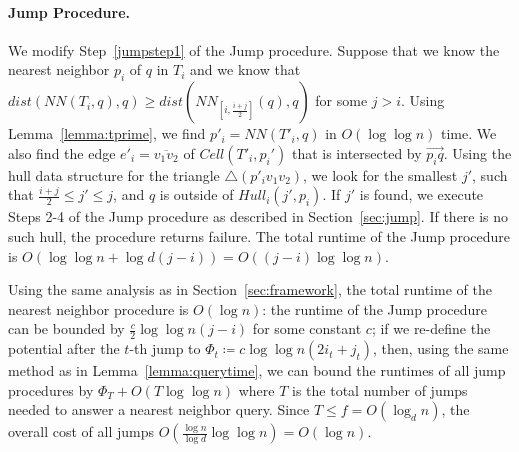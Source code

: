 \documentclass[10pt,a4paper]{amsart}
\newcommand{\ov}[1]{\overline{#1}}
\newcommand{\ovar}[1]{\overrightarrow{#1}}
\newcommand{\Cell}{\mathit{Cell}}
\newcommand{\Hull}{\mathit{Hull}}
\newcommand{\NN}{\mathit{NN}}
\begin{document}
\paragraph*{Jump Procedure.}
We modify Step~\ref{jumpstep1} of the Jump procedure. Suppose that we know the nearest neighbor $p_i$ of $q$ in $T_i$ and we know that %
$dist(\NN(T_i,q),q) \ge dist(\NN_{[i,\frac{i+j}{2}]}(q),q)$ for some $j>i$.
Using Lemma~\ref{lemma:tprime}, we find $p'_i=\NN(T'_i,q)$ in $O(\log\log n)$ time. We also find the edge $e'_i=\ov{v_1v_2}$ of $\Cell(T'_i, p_i')$ that  is intersected by $\ovar{p_iq}$.  Using the hull data structure for the triangle $\triangle(p'_iv_1v_2)$, we look for the smallest $j'$, such that $\frac{i+j}{2}\le j'\le j$,  and $q$ is outside of $\Hull_i(j',p_i)$. If $j'$ is found, we execute Steps 2-4 of the Jump procedure as described in Section~\ref{sec:jump}. If there is no such hull, the procedure returns failure.  The total runtime of the Jump procedure is $O(\log\log n + \log d(j-i))=O((j-i)\log \log n)$.

Using the same analysis as in Section~\ref{sec:framework}, the total runtime of the nearest neighbor procedure is $O(\log n)$: the runtime of the Jump procedure can be bounded by  $\frac{c}{2}\log\log n (j-i)$ for some constant $c$; if we re-define the potential after the $t$-th jump to $\Phi_t\coloneqq c\log\log n(2i_t+j_t)$, then, using the same method as in Lemma~\ref{lemma:querytime}, we can bound the runtimes of all jump procedures by $\Phi_T+O(T\log\log n)$ where $T$ is the total number of jumps needed to answer a nearest neighbor query. Since $T\le f=O(\log_d n)$, the overall cost of all jumps  $O(\frac{\log n}{\log d}\log\log n)=O(\log n)$. 
\end{document}
